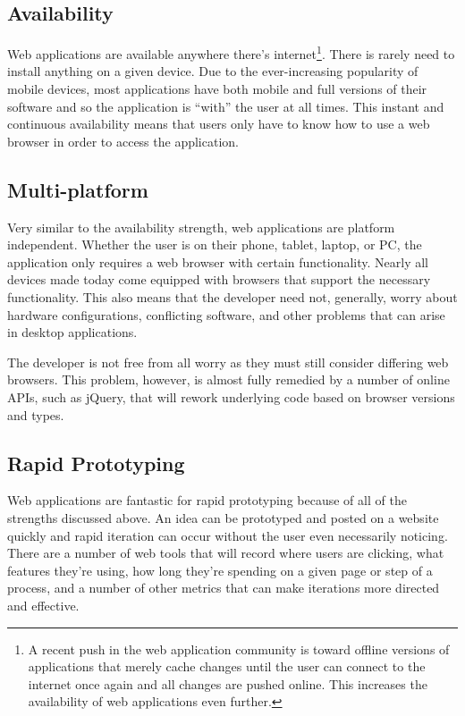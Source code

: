 \documentclass[12pt]{ucthesis}
\begin{document}
\subsection{Availability}
Web applications are available anywhere there's internet\footnote{A recent push in the web application community is toward offline versions of applications that merely cache changes until the user can connect to the internet once again and all changes are pushed online. This increases the availability of web applications even further.}. There is rarely need to install anything on a given device. Due to the ever-increasing popularity of mobile devices, most applications have both mobile and full versions of their software and so the application is ``with'' the user at all times. This instant and continuous availability means that users only have to know how to use a web browser in order to access the application.

\subsection{Multi-platform}
Very similar to the availability strength, web applications are platform independent. Whether the user is on their phone, tablet, laptop, or PC, the application only requires a web browser with certain functionality. Nearly all devices made today come equipped with browsers that support the necessary functionality. This also means that the developer need not, generally, worry about hardware configurations, conflicting software, and other problems that can arise in desktop applications. 

The developer is not free from all worry as they must still consider differing web browsers. This problem, however, is almost fully remedied by a number of online APIs, such as jQuery\cite{jQuery}, that will rework underlying code based on browser versions and types. 

\subsection{Rapid Prototyping}
Web applications are fantastic for rapid prototyping because of all of the strengths discussed above. An idea can be prototyped and posted on a website quickly and rapid iteration can occur without the user even necessarily noticing. There are a number of web tools that will record where users are clicking, what features they're using, how long they're spending on a given page or step of a process, and a number of other metrics that can make iterations more directed and effective.
\end{document}
